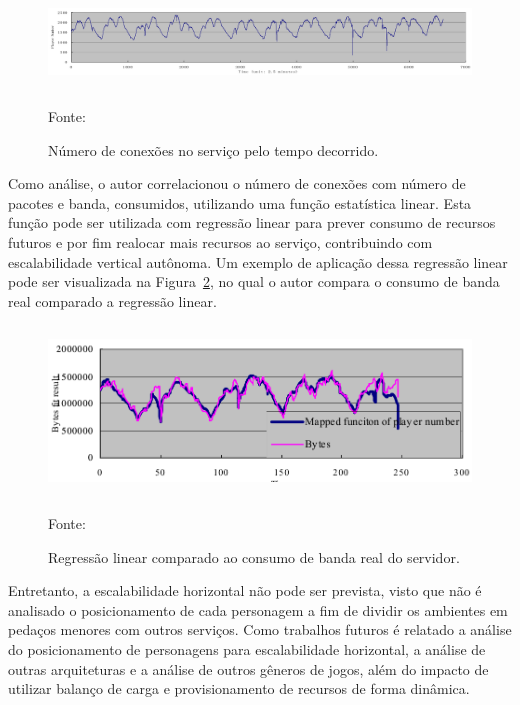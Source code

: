 \begin{figure}[htb!]
\caption{Número de conexões no serviço pelo tempo decorrido.}
\label{fig:players_peer_time}
\includegraphics[height=2.5cm]{img/cap2/players_peer_time.png}
\centering

Fonte:~\cite{1417630}
\end{figure}



Como análise, o autor correlacionou o número de conexões com número de pacotes e banda, consumidos, utilizando uma função estatística linear.
%
Esta função pode ser utilizada com regressão linear para prever consumo de recursos futuros e por fim realocar mais recursos ao serviço, contribuindo com escalabilidade vertical autônoma.
%
Um exemplo de aplicação dessa regressão linear pode ser visualizada na Figura~\ref{fig:regressao_bytes}, no qual o autor compara o consumo de banda real comparado a regressão linear.



\begin{figure}[htb!]
\caption{Regressão linear comparado ao consumo de banda real do servidor.}
\label{fig:regressao_bytes}
\includegraphics[height=4.5cm]{img/cap2/regressao.png}
\centering

Fonte:~\cite{1417630}
\end{figure}



Entretanto, a escalabilidade horizontal não pode ser prevista, visto que não é analisado o posicionamento de cada personagem a fim de dividir os ambientes em pedaços menores com outros serviços.
%
Como trabalhos futuros é relatado a análise do posicionamento de personagens para escalabilidade horizontal, a análise de outras arquiteturas e a análise de outros gêneros de jogos, além do impacto de utilizar balanço de carga e provisionamento de recursos de forma dinâmica.



